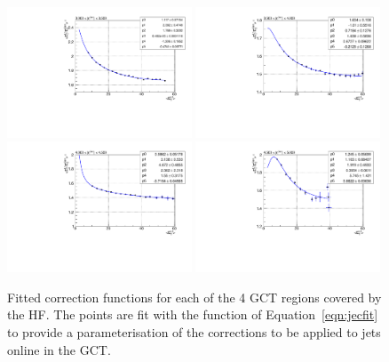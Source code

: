 \begin{figure}
\begin{center}
\includegraphics[width=0.49\textwidth]{detector/l1jet/egcor7.pdf}
\includegraphics[width=0.49\textwidth]{detector/l1jet/egcor8.pdf}\\
\includegraphics[width=0.49\textwidth]{detector/l1jet/egcor9.pdf}
\includegraphics[width=0.49\textwidth]{detector/l1jet/egcor10.pdf}
\end{center}
\caption{Fitted correction functions for each of the 4 GCT regions covered by the HF. 
The points are fit with the function of Equation~\ref{eqn:jecfit} to 
provide a parameterisation of the corrections to be applied to 
jets online in the GCT.}
\label{fig:allcorrfuncsp2}
\end{figure}

